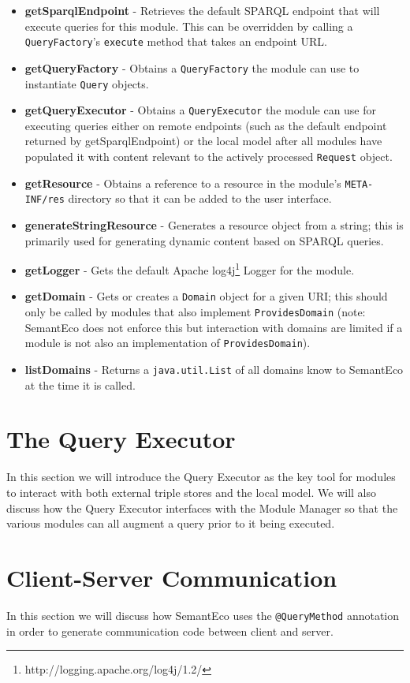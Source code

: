 \documentclass[letterpaper]{report}
\begin{document}
\begin{itemize}
\item\textbf{getSparqlEndpoint} - Retrieves the default SPARQL endpoint that will execute queries for this module. This can be overridden by calling a \texttt{QueryFactory}'s \texttt{execute} method that takes an endpoint URL.
\item\textbf{getQueryFactory} - Obtains a \texttt{QueryFactory} the module can use to instantiate \texttt{Query} objects.
\item\textbf{getQueryExecutor} - Obtains a \texttt{QueryExecutor} the module can use for executing queries either on remote endpoints (such as the default endpoint returned by getSparqlEndpoint) or the local model after all modules have populated it with content relevant to the actively processed \texttt{Request} object.
\item\textbf{getResource} - Obtains a reference to a resource in the module's \texttt{META-INF/res} directory so that it can be added to the user interface.
\item\textbf{generateStringResource} - Generates a resource object from a string; this is primarily used for generating dynamic content based on SPARQL queries.
\item\textbf{getLogger} - Gets the default Apache log4j\footnote{http://logging.apache.org/log4j/1.2/} Logger for the module.
\item\textbf{getDomain} - Gets or creates a \texttt{Domain} object for a given URI; this should only be called by modules that also implement \texttt{ProvidesDomain} (note: SemantEco does not enforce this but interaction with domains are limited if a module is not also an implementation of \texttt{ProvidesDomain}).
\item\textbf{listDomains} - Returns a \texttt{java.util.List} of all domains know to SemantEco at the time it is called.
\end{itemize}

\section{The Query Executor}
\label{query-executor}
In this section we will introduce the Query Executor as the key tool for modules to interact with both external triple stores and the local model. We will also discuss how the Query Executor interfaces with the Module Manager so that the various modules can all augment a query prior to it being executed.

\section{Client-Server Communication}
\label{client-server-comm}
In this section we will discuss how SemantEco uses the \texttt{@QueryMethod} annotation in order to generate communication code between client and server. 
\end{document}
